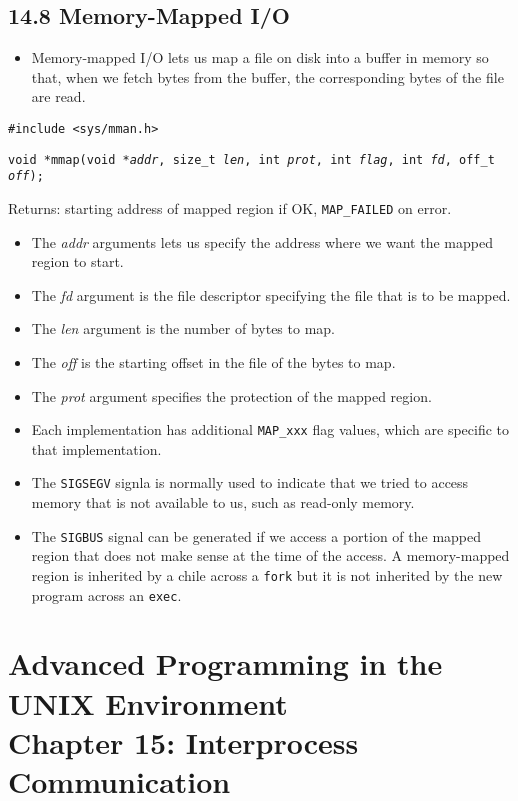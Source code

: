 \documentclass[]{article}
\newcommand{\code}{\texttt}
\begin{document}
\subsection*{14.8 Memory-Mapped I/O}
\begin{itemize}
\item Memory-mapped I/O lets us map a file on disk into a buffer in memory so
that, when we fetch bytes from the buffer, the corresponding bytes of the file
are read.
\end{itemize}

\code{\#include <sys/mman.h>}

\code{void *mmap(void *\emph{addr}, size\_t \emph{len}, int \emph{prot}, int
\emph{flag}, int \emph{fd}, off\_t \emph{off});}

Returns: starting address of mapped region if OK, \code{MAP\_FAILED} on error.

\begin{itemize}
\item The \emph{addr} arguments lets us specify the address where we want the
mapped region to start.
\item The \emph{fd} argument is the file descriptor specifying the file that is
to be mapped.
\item The \emph{len} argument  is the number of bytes to map.
\item The \emph{off} is the starting offset in the file of the bytes to map.
\item The \emph{prot} argument specifies the protection of the mapped region.
\item Each implementation has additional \code{MAP\_xxx} flag values, which are
specific to that implementation.
\item The \code{SIGSEGV} signla is normally used to indicate that we tried to
access memory that is not available to us, such as read-only memory.
\item The \code{SIGBUS} signal can be generated if we access a portion of the
mapped region that does not make sense at the time of the access.
\itme A memory-mapped region is inherited by a chile across a \code{fork} but it
is not inherited by the new program across an \code{exec}.
\end{itemize}


\section*{Advanced Programming in the UNIX Environment \\
Chapter 15: Interprocess Communication}
\end{document}

